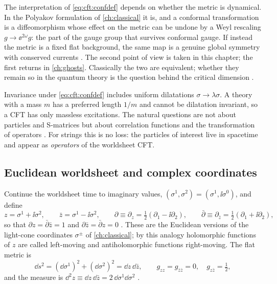 The interpretation of \eqref{eq:cft:confdef} depends on whether the metric is dynamical. In the
Polyakov formulation of \cref{ch:classical} it is, and a conformal transformation is a
diffeomorphism whose effect on the metric can be undone by a Weyl rescaling
$g\to\ee^{2\omega}g$: the part of the gauge group that survives conformal gauge. If instead the
metric is a fixed flat background, the same map is a genuine global symmetry with conserved
currents . The second point of view is taken in this chapter; the
first returns in \cref{ch:ghosts}. Classically the two are equivalent; whether they remain so in
the quantum theory is the question behind the critical dimension
.

\begin{physicsbox}
Invariance under \eqref{eq:cft:confdef} includes uniform dilatations $\sigma\to\lambda\sigma$. A
theory with a mass $m$ has a preferred length $1/m$ and cannot be dilatation invariant, so a CFT
has only massless excitations. The natural questions are not about particles and S-matrices but
about correlation functions and the transformation of operators
. For strings this is no loss: the particles of interest live in
spacetime and appear as \emph{operators} of the worldsheet CFT.
\end{physicsbox}

\subsection{Euclidean worldsheet and complex coordinates}

Continue the worldsheet time to imaginary values, $(\sigma^1,\sigma^2)=(\sigma^1,\ii\sigma^0)$,
and define
\begin{equation}\label{eq:cft:zdef}
  z=\sigma^1+\ii\sigma^2,\qquad \bar z=\sigma^1-\ii\sigma^2,\qquad
  \partial\equiv\partial_z=\tfrac12(\partial_1-\ii\partial_2),\qquad
  \bar\partial\equiv\partial_{\bar z}=\tfrac12(\partial_1+\ii\partial_2),
\end{equation}
so that $\partial z=\bar\partial\bar z=1$ and $\partial\bar z=\bar\partial z=0$
. These are the Euclidean versions of the light-cone
coordinates $\sigma^\pm$ of \cref{ch:classical}; by this analogy holomorphic functions of $z$ are
called left-moving and antiholomorphic functions right-moving. The flat metric is
\begin{equation}\label{eq:cft:flat}
  \dd s^2=(\dd\sigma^1)^2+(\dd\sigma^2)^2=\dd z\,\dd\bar z,
  \qquad g_{zz}=g_{\bar z\bar z}=0,\quad g_{z\bar z}=\tfrac12 ,
\end{equation}
and the measure is $\dd^2z\equiv\dd z\,\dd\bar z=2\,\dd\sigma^1\dd\sigma^2$
.

